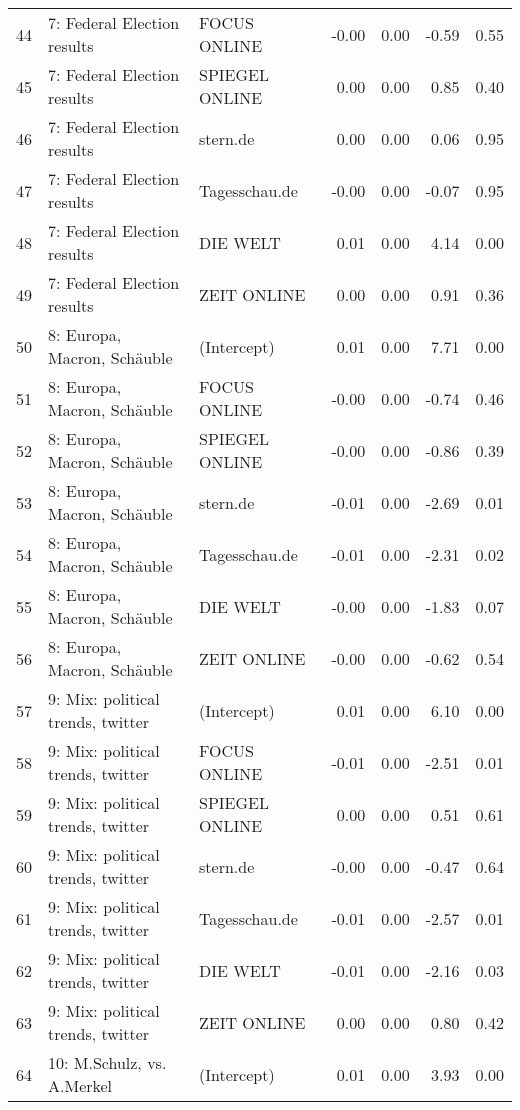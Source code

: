 \begin{table}[ht]
{\begin{tabular}{rllrrrr}
  44 & 7: Federal Election results & FOCUS ONLINE & -0.00 & 0.00 & -0.59 & 0.55 \\ 
  45 & 7: Federal Election results & SPIEGEL ONLINE & 0.00 & 0.00 & 0.85 & 0.40 \\ 
  46 & 7: Federal Election results & stern.de & 0.00 & 0.00 & 0.06 & 0.95 \\ 
  47 & 7: Federal Election results & Tagesschau.de & -0.00 & 0.00 & -0.07 & 0.95 \\ 
  48 & 7: Federal Election results & DIE WELT & 0.01 & 0.00 & 4.14 & 0.00 \\ 
  49 & 7: Federal Election results & ZEIT ONLINE & 0.00 & 0.00 & 0.91 & 0.36 \\ 
  50 & 8: Europa, Macron, Schäuble & (Intercept) & 0.01 & 0.00 & 7.71 & 0.00 \\ 
  51 & 8: Europa, Macron, Schäuble & FOCUS ONLINE & -0.00 & 0.00 & -0.74 & 0.46 \\ 
  52 & 8: Europa, Macron, Schäuble & SPIEGEL ONLINE & -0.00 & 0.00 & -0.86 & 0.39 \\ 
  53 & 8: Europa, Macron, Schäuble & stern.de & -0.01 & 0.00 & -2.69 & 0.01 \\ 
  54 & 8: Europa, Macron, Schäuble & Tagesschau.de & -0.01 & 0.00 & -2.31 & 0.02 \\ 
  55 & 8: Europa, Macron, Schäuble & DIE WELT & -0.00 & 0.00 & -1.83 & 0.07 \\ 
  56 & 8: Europa, Macron, Schäuble & ZEIT ONLINE & -0.00 & 0.00 & -0.62 & 0.54 \\ 
  57 & 9: Mix: political trends, twitter & (Intercept) & 0.01 & 0.00 & 6.10 & 0.00 \\ 
  58 & 9: Mix: political trends, twitter & FOCUS ONLINE & -0.01 & 0.00 & -2.51 & 0.01 \\ 
  59 & 9: Mix: political trends, twitter & SPIEGEL ONLINE & 0.00 & 0.00 & 0.51 & 0.61 \\ 
  60 & 9: Mix: political trends, twitter & stern.de & -0.00 & 0.00 & -0.47 & 0.64 \\ 
  61 & 9: Mix: political trends, twitter & Tagesschau.de & -0.01 & 0.00 & -2.57 & 0.01 \\ 
  62 & 9: Mix: political trends, twitter & DIE WELT & -0.01 & 0.00 & -2.16 & 0.03 \\ 
  63 & 9: Mix: political trends, twitter & ZEIT ONLINE & 0.00 & 0.00 & 0.80 & 0.42 \\ 
  64 & 10: M.Schulz, vs. A.Merkel & (Intercept) & 0.01 & 0.00 & 3.93 & 0.00 \\ 

\end{tabular}}
\end{table}
